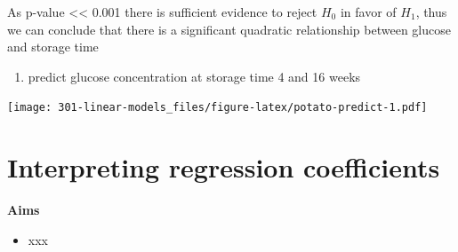 \documentclass[
]{book}
\newenvironment{Shaded}{\begin{snugshade}}{\end{snugshade}}
\newcommand{\DataTypeTok}[1]{\textcolor[rgb]{0.13,0.29,0.53}{#1}}
\newcommand{\DecValTok}[1]{\textcolor[rgb]{0.00,0.00,0.81}{#1}}
\newcommand{\KeywordTok}[1]{\textcolor[rgb]{0.13,0.29,0.53}{\textbf{#1}}}
\newcommand{\NormalTok}[1]{#1}
\newcommand{\OperatorTok}[1]{\textcolor[rgb]{0.81,0.36,0.00}{\textbf{#1}}}
\newcommand{\StringTok}[1]{\textcolor[rgb]{0.31,0.60,0.02}{#1}}
\providecommand{\tightlist}{%
  \setlength{\itemsep}{0pt}\setlength{\parskip}{0pt}}
\theoremstyle{definition}
\theoremstyle{definition}
\theoremstyle{definition}
\theoremstyle{remark}
\begin{document}
As p-value \textless\textless{} 0.001 there is sufficient evidence to reject \(H_0\) in favor of \(H_1\), thus we can conclude that there is a significant quadratic relationship between glucose and storage time

\begin{enumerate}
\def\labelenumi{\alph{enumi})}
\setcounter{enumi}{4}
\tightlist
\item
  predict glucose concentration at storage time 4 and 16 weeks
\end{enumerate}

\begin{Shaded}
\end{Shaded}

\texttt{[image: 301-linear-models\_files/figure-latex/potato-predict-1.pdf]}

\hypertarget{interpreting-regression-coefficients}{%
\chapter{Interpreting regression coefficients}\label{interpreting-regression-coefficients}}

\textbf{Aims}

\begin{itemize}
\tightlist
\item
  xxx
\end{itemize}
\end{document}
